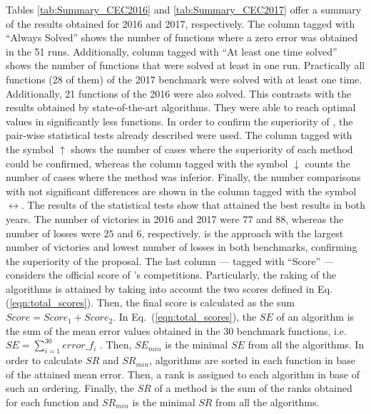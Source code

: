 Tables \ref{tab:Summary_CEC2016} and \ref{tab:Summary_CEC2017} offer a summary of the results obtained for \CEC{} 2016 and \CEC{} 2017, respectively.
%
The column tagged with ``Always Solved'' shows the number of functions where a zero error was obtained in the 51 runs.
%
Additionally, column tagged with ``At least one time solved'' shows the number of functions that were solved at least in one run.
%
Practically all functions (28 of them) of the \CEC{} 2017 benchmark were solved with \DEEDM{} at least one time.
%
Additionally, 21 functions of the \CEC{} 2016 were also solved.
%
This contrasts with the results obtained by state-of-the-art algorithms.
%
They were able to reach optimal values in significantly less functions.
%
In order to confirm the superiority of \DEEDM{}, the pair-wise statistical tests already described were used.
%
The column tagged with the symbol $\uparrow$ shows the number of cases where the superiority of each method could be confirmed, whereas
the column tagged with the symbol $\downarrow$ counts the number of cases where the method was inferior.
%
Finally, the number comparisons with not significant differences are shown in the column tagged with the symbol $\longleftrightarrow$.
%
The results of the statistical tests show that \DEEDM{} attained the best results in both years.
%
The number of victories in \CEC{} 2016 and \CEC{} 2017 were $77$ and $88$, whereas 
the number of losses were $25$ and $6$, respectively.
%
\DEEDM{} is the approach with the largest number of victories and lowest number of losses in both benchmarks, confirming the superiority
of the proposal.
%
%
The last column --- tagged with ``Score'' --- considers the official score of \CEC{}'s competitions.
%
Particularly, the raking of the algorithms is attained by taking into account the two scores defined in Eq. (\ref{eqn:total_scores}).
%
Then, the final score is calculated as the sum $Score = Score_1 + Score_2$.
%
In Eq.~(\ref{eqn:total_scores}), the $SE$ of an algorithm is the sum of the mean error values obtained in the $30$ benchmark functions, i.e. 
$SE = \sum_{i=1}^{30} error\_f_i$ .
%
Then, $SE_{min}$ is the minimal $SE$ from all the algorithms. 
%
In order to calculate $SR$ and $SR_{min}$, algorithms are sorted in each function in base of the attained mean error.
%
Then, a rank is assigned to each algorithm in base of such an ordering.
%
Finally, the $SR$ of a method is the sum of the ranks obtained for each function and $SR_{min}$ is the minimal $SR$ from all the algorithms.

